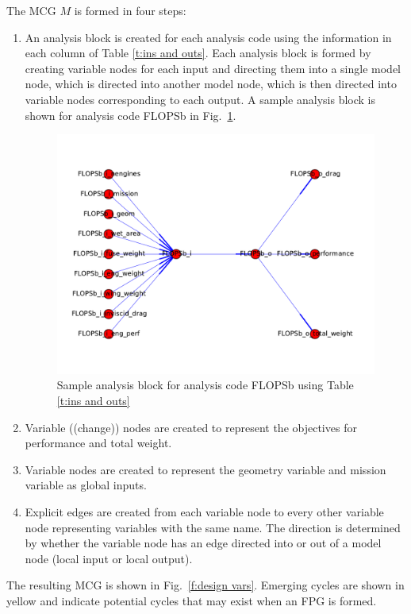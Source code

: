 The MCG $M$ is formed in four steps:
\begin{enumerate}
\item An analysis block is created for each analysis code using the information in each column of Table \ref{t:ins and outs}. Each analysis block is formed by creating variable nodes for each input and directing them into a single model node, which is directed into another model node, which is then directed into variable nodes corresponding to each output. 
A sample analysis block is shown for analysis code FLOPSb in Fig.~\ref{f:FLOPSb analysis block}.
\begin{figure}[htb!]
  \begin{center}
    \includegraphics[width=.6\textwidth]{images/FLOPSb_analysis_block}
  \end{center}
  \caption{Sample analysis block for analysis code FLOPSb using Table \ref{t:ins and outs}}
\label{f:FLOPSb analysis block}
\end{figure}

\item Variable ((change)) nodes are created to represent the objectives for performance and total weight.

\item Variable nodes are created to represent the geometry variable and mission variable as global inputs.

\item Explicit edges are created from each variable node to every other variable node representing variables with the same name. The direction is determined by whether the variable node has an edge directed into or out of a model node (local input or local output).
\end{enumerate}
The resulting MCG is shown in Fig.~\ref{f:design vars}. Emerging cycles are shown in yellow and indicate potential cycles that may exist when an FPG is formed.
